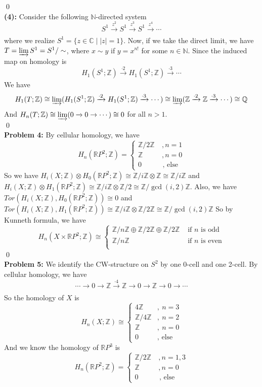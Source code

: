 \documentclass[12pt]{amsart}
\newcommand{\R}{\mathbb{R}}
\newcommand{\Q}{\mathbb{Q}}
\newcommand{\C}{\mathbb{C}}
\newcommand{\Z}{\mathbb{Z}}
\newcommand{\N}{\mathbb{N}}
\begin{document}
\qed\\
\textbf{(4):} Consider the following $\N$-directed system
\[S^1\xrightarrow[]{z^2}S^1\xrightarrow[]{z^3}S^1\xrightarrow[]{z^4}\cdots\]
where we realize $S^1=\{z\in\C\mid |z|=1\}$. Now, if we take the direct limit, we have $T=\varinjlim S^1=S^1/\sim$, where $x\sim y$ if $y=x^{n!}$ for some $n\in \N$. Since the induced map on homology is 
\[H_1(S^1;\Z)\xrightarrow[]{\cdot 2}H_1(S^1;\Z)\xrightarrow[]{\cdot 3}\cdots\]
We have 
\[H_1(T;\Z)\cong \varinjlim (H_1(S^1;\Z)\xrightarrow[]{\cdot 2}H_1(S^1;\Z)\xrightarrow[]{\cdot 3}\cdots)\cong \varinjlim (\Z\xrightarrow[]{\cdot 2}\Z\xrightarrow[]{\cdot 3}\cdots)\cong \Q\]
And $H_n(T;\Z)\cong \varinjlim (0\xrightarrow[]{}0\to\cdots)\cong 0$ for all $n>1$.
\\\qed\\
\textbf{Problem 4:}
By cellular homology, we have 
\[H_n(\R P^2;\Z)=\begin{cases}
    \Z/2\Z & \ ,n=1\\
    \Z & \ ,n=0\\
0 & \text{ , else}
\end{cases}\]
So we have $H_i(X;\Z)\otimes H_0(\R P^2;\Z)\cong \Z/i\Z\otimes \Z\cong \Z/i\Z$ and $H_i(X;\Z)\otimes H_1(\R P^2;\Z)\cong \Z/i\Z\otimes \Z/2\cong \Z/\gcd(i,2)\Z$. Also, we have $Tor(H_i(X;\Z),H_0(\R P^2;\Z))\cong 0$ and $Tor(H_i(X;\Z),H_1(\R P^2;\Z))\cong\Z/i\Z\otimes \Z/2\Z\cong \Z/\gcd(i,2)\Z $
So by Kunneth formula, we have 
\[H_n(X\times \R P^2;\Z)\cong\begin{cases}
    \Z/n\Z\oplus \Z/2\Z\oplus \Z/2\Z & \text{ if $n$ is odd}\\  
    \Z/n\Z & \text{ if $n$ is even}\\  
\end{cases} \]
\qed\\
\textbf{Problem 5:} We identify the CW-structure on $S^2$ by one 0-cell and one 2-cell. By cellular homology, we have 
\[\cdots\to 0\to \Z\xrightarrow[]{\cdot 4}\Z\to 0\to\Z\to 0\to \cdots\]
So the homology of $X$ is 
\[H_n(X;\Z)\cong \begin{cases}
    4\Z&,\ n=3\\
    \Z/4\Z&, \ n=2\\
    \Z& , \ n=0\\
    0 &, \text{ else}
\end{cases}\]
And we know the homology of $\R P^3$ is 
\[H_n(\R P^2;\Z)=\begin{cases}
    \Z/2\Z & \ ,n=1,3\\
    \Z & \ ,n=0\\
0 & \text{ , else}
\end{cases}\]
\end{document}

